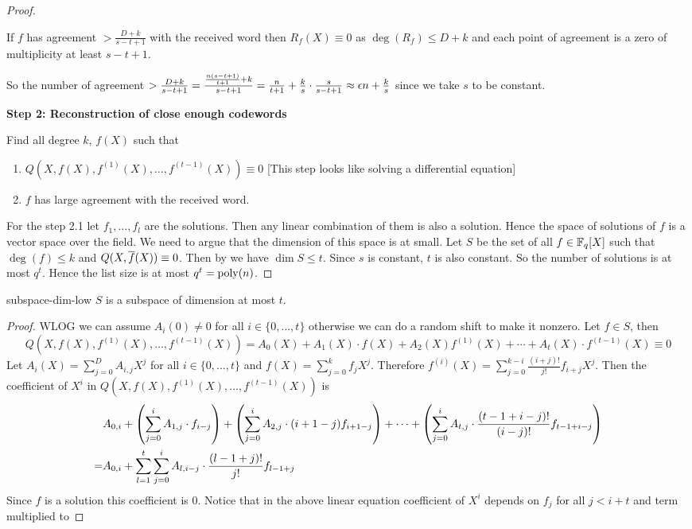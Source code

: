 \begin{proof}
\begin{observation}
    If $f$ has agreement $>\frac{D+k}{s-t+1}$ with the received word then $R_f(X)\equiv 0$ as $\deg(R_f)\leq D+k$ and each point of agreement is a zero of multiplicity at least $s-t+1$.
\end{observation}
So the number of agreement $>\frac{D+k}{s-t+1}=\frac{\frac{n(s-t+1)}{t+1}+k}{s-t+1}=\frac{n}{t+1}+\frac{k}{s}\cdot \frac{s}{s-t+1}\approx \epsilon n+\frac{k}{s}$ since we take $s$ to be constant. \parinf\vspace*{5mm}

\textbf{Step 2: Reconstruction of close enough codewords}\parinn

Find all degree $k$, $f(X)$ such that \begin{enumerate}[label=Step 2.\arabic*:, leftmargin=*]
    \item $Q(X,f(X), f^{(1)}(X),\dots, f^{(t-1)}(X))\equiv 0$ [This step looks like solving a differential equation]
    \item $f$ has large agreement with the received word.
\end{enumerate}
For the step 2.1 let $f_1,\dots, f_l$ are the solutions. Then any linear combination of them is also a solution. Hence the space of solutions of $f$ is a vector space over  the field. We need to argue that the dimension of this space is at small. Let $S$ be the set of all $f\in \mathbb{F}_q[X]$ such that $\deg(f)\leq k$ and $Q(X,\overline{f}(X))\equiv 0$. Then by  we have $\dim S\leq t$. Since $s$ is constant, $t$ is also constant. So the number of solutions is at most $q^t$. Hence the list size is at most $q^t=\operatorname{poly}(n)$. 
\end{proof}
\begin{lemma}{}{subspace-dim-low}
$S$ is a subspace of dimension at most $t$. 
\end{lemma}
\begin{proof}
WLOG we can assume $A_i(0)\neq 0$ for all $i\in\{0,\dots, t\}$ otherwise we can do a random shift to make it nonzero. Let $f\in S$, then $$Q(X,f(X),f^{(1)}(X),\dots, f^{(t-1)}(X))=A_0(X)+A_1(X)\cdot f(X)+A_2(X)f^{(1)}(X)+\cdots +A_t(X)\cdot f^{(t-1)}(X)\equiv 0$$Let $A_i(X)=\sum\limits_{j=0}^D A_{i,j}X^j$ for all $i\in\{0,\dots, t\}$ and $f(X)=\sum\limits_{j=0}^k f_j X^j$. Therefore $f^{(i)}(X)=\sum\limits_{j=0}^{k-i}\frac{(i+j)!}{j!}f_{i+j}X^j$. Then the coefficient of $X^i$ in $Q(X,f(X),f^{(1)}(X),\dots, f^{(t-1)}(X))$ is \begin{align*}
    &A_{0,i}+\left(\sum\limits_{j=0}^iA_{1,j}\cdot f_{i-j}\right)+\left( \sum\limits_{j=0}^i A_{2,j}\cdot  (i+1-j)f_{i+1-j} \right)+\cdots + \left( \sum\limits_{j=0}^i A_{t,j}\cdot \frac{(t-1+i-j)!}{(i-j)!}f_{t-1+i-j} \right)\\ 
    = & A_{0,i}+\sum\limits_{l=1}^{t}\sum\limits_{j=0}^i A_{l,i-j}\cdot \frac{(l-1+j)!}{j!}f_{l-1+j}
\end{align*}Since $f$ is a solution this coefficient is $0$. Notice that in the above linear equation coefficient of $X^i$ depends on $f_j$ for all $j<i+t$ and term multiplied to 
\end{proof}


